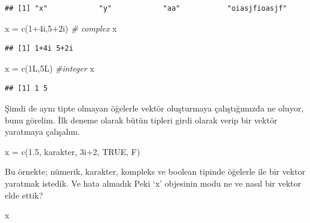 \documentclass[
]{book}
\newenvironment{Shaded}{\begin{snugshade}}{\end{snugshade}}
\newcommand{\CommentTok}[1]{\textcolor[rgb]{0.56,0.35,0.01}{\textit{#1}}}
\newcommand{\ConstantTok}[1]{\textcolor[rgb]{0.00,0.00,0.00}{#1}}
\newcommand{\DecValTok}[1]{\textcolor[rgb]{0.00,0.00,0.81}{#1}}
\newcommand{\FloatTok}[1]{\textcolor[rgb]{0.00,0.00,0.81}{#1}}
\newcommand{\FunctionTok}[1]{\textcolor[rgb]{0.00,0.00,0.00}{#1}}
\newcommand{\NormalTok}[1]{#1}
\newcommand{\OtherTok}[1]{\textcolor[rgb]{0.56,0.35,0.01}{#1}}
\newcommand{\SpecialCharTok}[1]{\textcolor[rgb]{0.00,0.00,0.00}{#1}}
\newcommand{\StringTok}[1]{\textcolor[rgb]{0.31,0.60,0.02}{#1}}
\begin{document}
\begin{verbatim}
## [1] "x"            "y"            "aa"           "oiasjfioasjf"
\end{verbatim}

\begin{Shaded}
\begin{Highlighting}[]
\NormalTok{x }\OtherTok{=} \FunctionTok{c}\NormalTok{(}\DecValTok{1}\SpecialCharTok{+}\NormalTok{4i,}\DecValTok{5}\SpecialCharTok{+}\NormalTok{2i) }\CommentTok{\# complex}
\NormalTok{x}
\end{Highlighting}
\end{Shaded}

\begin{verbatim}
## [1] 1+4i 5+2i
\end{verbatim}

\begin{Shaded}
\begin{Highlighting}[]
\NormalTok{x }\OtherTok{=} \FunctionTok{c}\NormalTok{(1L,5L) }\CommentTok{\#integer}
\NormalTok{x}
\end{Highlighting}
\end{Shaded}

\begin{verbatim}
## [1] 1 5
\end{verbatim}

Şimdi de aynı tipte olmayan öğelerle vektör oluşturmaya çalıştığımızda ne oluyor, bunu görelim. İlk deneme olarak bütün tipleri girdi olarak verip bir vektör yaratmaya çalışalım.

\begin{Shaded}
\begin{Highlighting}[]
\NormalTok{x }\OtherTok{=} \FunctionTok{c}\NormalTok{(}\FloatTok{1.5}\NormalTok{, }\StringTok{\textquotesingle{}karakter\textquotesingle{}}\NormalTok{, 3i}\SpecialCharTok{+}\DecValTok{2}\NormalTok{, }\ConstantTok{TRUE}\NormalTok{, F)}
\end{Highlighting}
\end{Shaded}

Bu örnekte; nümerik, karakter, kompleks ve boolean tipinde öğelerle ile bir vektor yaratmak istedik. Ve hata almadık Peki `x' objesinin modu ne ve nasıl bir vektor elde ettik?

\begin{Shaded}
\begin{Highlighting}[]
\NormalTok{x}
\end{Highlighting}
\end{Shaded}
\end{document}
